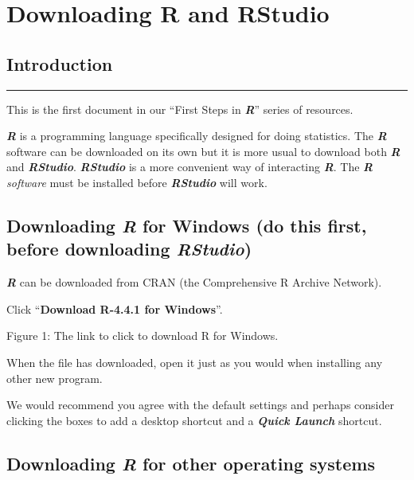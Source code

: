 \documentclass[
]{book}
\begin{document}
\chapter{Downloading R and RStudio}\label{downloading-r-and-rstudio}

\section{Introduction}\label{introduction}

\begin{center}\rule{0.5\linewidth}{0.5pt}\end{center}

This is the first document in our ``First Steps in \textbf{\emph{R}}'' series of resources.

\textbf{\emph{R}} is a programming language specifically designed for doing statistics. The \textbf{\emph{R}} software can be downloaded on its own but it is more usual to download both \textbf{\emph{R}} and \textbf{\emph{RStudio}}. \textbf{\emph{RStudio}} is a more convenient way of interacting \textbf{\emph{R}}. The \textbf{\emph{R}} \emph{software} must be installed before \textbf{\emph{RStudio}} will work.

\section{\texorpdfstring{Downloading \textbf{\emph{R}} for Windows (do this first, before downloading \textbf{\emph{RStudio}})}{Downloading R for Windows (do this first, before downloading RStudio)}}\label{downloading-r-for-windows-do-this-first-before-downloading-rstudio}

\textbf{\emph{R}} can be downloaded from CRAN (the Comprehensive R Archive Network).

Click ``\textbf{Download R-4.4.1 for Windows}''.

Figure 1: The link to click to download R for Windows.

When the file has downloaded, open it just as you would when installing any other new program.

We would recommend you agree with the default settings and perhaps consider clicking the boxes to add a desktop shortcut and a \textbf{\emph{Quick Launch}} shortcut.

\section{\texorpdfstring{Downloading \textbf{\emph{R}} for other operating systems}{Downloading R for other operating systems}}\label{downloading-r-for-other-operating-systems}
\end{document}
